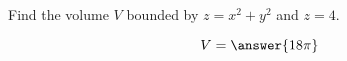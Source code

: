 \documentclass{ximera}
\author{David Guichard \and Neal Koblitz \and H. Jerome Keisler \and Albert Scheller \and Barry Balof \and Mike Wills \and Matthew Carr}
\begin{document}
\begin{exercise}




Find the volume $V$ bounded by $z=x^2+y^2$ and $z=4$. 
\begin{prompt}
\[
V=\answer{18\pi}
\]
\end{prompt}



\end{exercise}
\end{document}
